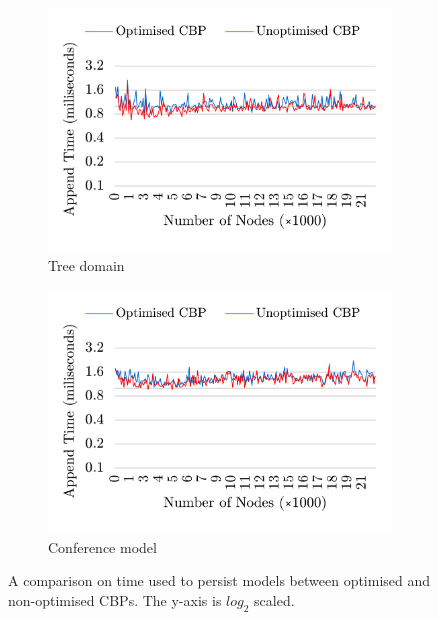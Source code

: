 \documentclass{llncs}
\begin{document}
\begin{figure}[ht]	
	\begin{subfigure}[t]{0.5\linewidth}
		\includegraphics[width=\linewidth]{append_speed_tree}
		\caption{Tree domain}\label{fig:append_speed_tree}		
	\end{subfigure}
	\hfill
	\begin{subfigure}[t]{0.5\linewidth}
		\includegraphics[width=\linewidth]{append_speed_conf}
		\caption{Conference model}\label{fig:append_speed_conference}
	\end{subfigure}
	\caption{A comparison on time used to persist models between optimised and non-optimised CBPs. The y-axis is $log_2$ scaled.}
	\label{fig:append_speed}
\end{figure}
\end{document}
